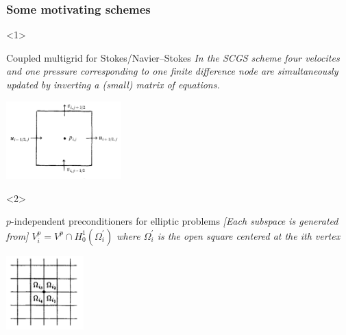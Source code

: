 \documentclass[presentation,aspectratio=43, 10pt]{beamer}
\begin{document}
\begin{frame}[t]
  \frametitle{Some motivating schemes}
  \begin{onlyenv}<1>
    \begin{block}{Coupled multigrid for Stokes/Navier--Stokes}
      \emph{In the SCGS scheme four velocites and one pressure
      corresponding to one finite difference node are simultaneously
      updated by inverting a (small) matrix of equations.}

      \begin{center}
        \includegraphics[height=3cm]{vanka}
      \end{center}
      \begin{flushright}
        \textcite{Vanka:1986} \hspace{4em}
      \end{flushright}
    \end{block}
  \end{onlyenv}
  \begin{onlyenv}<2>
    \begin{block}{$p$-independent preconditioners for elliptic problems}
      \emph{[Each subspace is generated from]
      $V_i^p = V^p \cap H^1_0(\Omega_i^{'})$ where $\Omega_i^{'}$ is the open square
      centered at the ith vertex}
      \begin{center}
        \includegraphics[width=3cm]{pavarino}
      \end{center}
      \begin{flushright}
        \textcite{Pavarino:1993} \hspace{4em}
      \end{flushright}
    \end{block}
  \end{onlyenv}


\end{frame}
\end{document}
